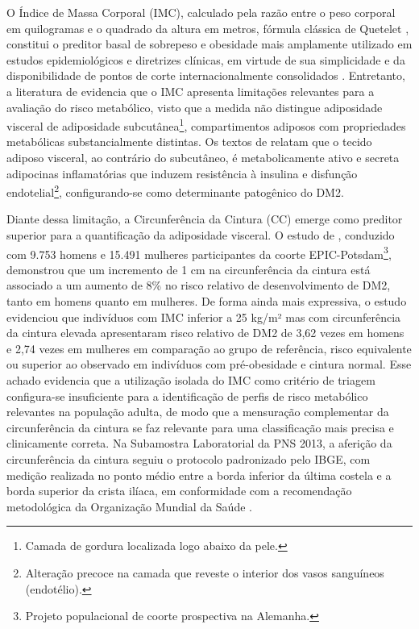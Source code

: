 O Índice de Massa Corporal (IMC), calculado pela razão entre o peso corporal em quilogramas e o quadrado da altura em metros, fórmula clássica de Quetelet \cite{eknoyan2008adolphe}, constitui o preditor basal de sobrepeso e obesidade mais amplamente utilizado em estudos epidemiológicos e diretrizes clínicas, em virtude de sua simplicidade e da disponibilidade de pontos de corte internacionalmente consolidados \cite{mlynarska2025type}. Entretanto, a literatura de \textcite{Feller2010} evidencia que o IMC apresenta limitações relevantes para a avaliação do risco metabólico, visto que a medida não distingue adiposidade visceral de adiposidade subcutânea\footnote{Camada de gordura localizada logo abaixo da pele.}, compartimentos adiposos com propriedades metabólicas substancialmente distintas. Os textos de \textcite{Feller2010,mlynarska2025type} relatam que o tecido adiposo visceral, ao contrário do subcutâneo, é metabolicamente ativo e secreta adipocinas inflamatórias que induzem resistência à insulina e disfunção endotelial\footnote{Alteração precoce na camada que reveste o interior dos vasos sanguíneos (endotélio).}, configurando-se como determinante patogênico do DM2.

Diante dessa limitação, a Circunferência da Cintura (CC) emerge como preditor superior para a quantificação da adiposidade visceral. O estudo de \textcite{Feller2010}, conduzido com 9.753 homens e 15.491 mulheres participantes da coorte EPIC-Potsdam\footnote{Projeto populacional de coorte prospectiva na Alemanha.}, demonstrou que um incremento de 1 cm na circunferência da cintura está associado a um aumento de 8\% no risco relativo de desenvolvimento de DM2, tanto em homens quanto em mulheres. De forma ainda mais expressiva, o estudo evidenciou que indivíduos com IMC inferior a 25 kg/m² mas com circunferência da cintura elevada apresentaram risco relativo de DM2 de 3,62 vezes em homens e 2,74 vezes em mulheres em comparação ao grupo de referência, risco equivalente ou superior ao observado em indivíduos com pré-obesidade e cintura normal. Esse achado evidencia que a utilização isolada do IMC como critério de triagem configura-se insuficiente para a identificação de perfis de risco metabólico relevantes na população adulta, de modo que a mensuração complementar da circunferência da cintura se faz relevante para uma classificação mais precisa e clinicamente correta. Na Subamostra Laboratorial da PNS 2013, a aferição da circunferência da cintura seguiu o protocolo padronizado pelo IBGE, com medição realizada no ponto médio entre a borda inferior da última costela e a borda superior da crista ilíaca, em conformidade com a recomendação metodológica da Organização Mundial da Saúde \cite{IBGE_PNS2013_Exames}.

